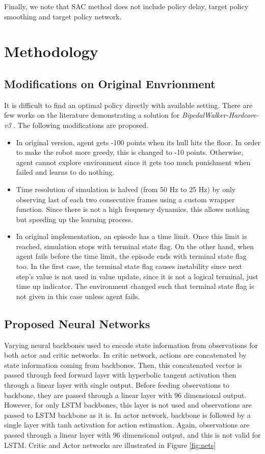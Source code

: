 \documentclass[a4paper, 12pt]{article} %
\begin{document}
Finally, we note that SAC method does not include policy delay, target policy smoothing and target policy network. 

\section{Methodology}

\subsection{Modifications on Original Envrionment}

It is difficult to find an optimal policy directly with available setting. 
There are few works on the literature demonstrating a solution for \textit{BipedalWalker-Hardcore-v3} . 
The following modifications are proposed.

\begin{itemize}
	\item In original version, agent gets -100 points when its hull hits the floor. 
	In order to make the robot more greedy, this is changed to -10 points. 
	Otherwise, agent cannot explore environment since it gets too much punishment when failed and learns to do nothing.
	\item Time resolution of simulation is halved (from 50 Hz to 25 Hz) by only observing last of each two consecutive frames using a custom wrapper function. 
	Since there is not a high frequency dynamics, this allows nothing but speeding up the learning process.
	\item In original implementation, an episode has a time limit. 
	Once this limit is reached, simulation stops with terminal state flag. 
	On the other hand, when agent fails before the time limit, the episode ends with terminal state flag too. 
	In the first case, the terminal state flag causes instability since next step's value is not used in value update, since it is not a logical terminal, just time up indicator.
	The environment changed such that terminal state flag is not given in this case unless agent fails. 
\end{itemize}

\subsection{Proposed Neural Networks}
\label{sec:proposed_networks}

Varying neural backbones used to encode state information from observations for both actor and critic networks. 
In critic network, actions are concatenated by state information coming from backbones. 
Then, this concatenated vector is passed through feed forward layer with hyperbolic tangent activation then through a linear layer with single output. 
Before feeding observations to backbone, they are passed through a linear layer with 96 dimensional output. 
However, for only LSTM backbones, this layer is not used and observations are passed to LSTM backbone as it is. 
In actor network, backbone is followed by a single layer with tanh activation for action estimation. 
Again, observations are passed through a linear layer with 96 dimensional output, and this is not valid for LSTM.
Critic and Actor networks are illustrated in Figure \ref{fig:nets} 
\end{document}
